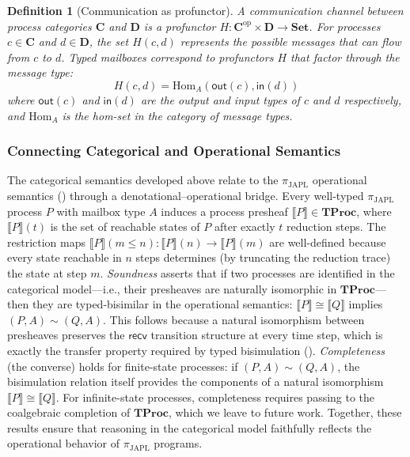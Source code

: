 \documentclass[11pt,a4paper]{article}
\newtheorem{definition}[theorem]{Definition}
\newcommand{\bisim}{\sim}
\newcommand{\Cat}[1]{\mathbf{#1}}
\newcommand{\Set}{\Cat{Set}}
\newcommand{\Hom}{\mathrm{Hom}}
\newcommand{\op}{\mathrm{op}}
\begin{document}
\begin{definition}[Communication as profunctor]\label{def:profunctor}
A \emph{communication channel} between process categories $\Cat{C}$ and $\Cat{D}$ is a profunctor $H : \Cat{C}^{\op} \times \Cat{D} \to \Set$. For processes $c \in \Cat{C}$ and $d \in \Cat{D}$, the set $H(c, d)$ represents the possible messages that can flow from $c$ to $d$. Typed mailboxes correspond to profunctors $H$ that factor through the message type:
\[
H(c, d) = \Hom_A(\mathsf{out}(c), \mathsf{in}(d))
\]
where $\mathsf{out}(c)$ and $\mathsf{in}(d)$ are the output and input types of $c$ and $d$ respectively, and $\Hom_A$ is the hom-set in the category of message types.
\end{definition}

\subsubsection{Connecting Categorical and Operational Semantics}

The categorical semantics developed above relate to the $\pi_{\text{JAPL}}$ operational semantics () through a denotational--operational bridge. Every well-typed $\pi_{\text{JAPL}}$ process $P$ with mailbox type $A$ induces a process presheaf $\llbracket P \rrbracket \in \Cat{TProc}$, where $\llbracket P \rrbracket(t)$ is the set of reachable states of $P$ after exactly $t$ reduction steps. The restriction maps $\llbracket P \rrbracket(m \leq n) : \llbracket P \rrbracket(n) \to \llbracket P \rrbracket(m)$ are well-defined because every state reachable in $n$ steps determines (by truncating the reduction trace) the state at step $m$. \emph{Soundness} asserts that if two processes are identified in the categorical model---i.e., their presheaves are naturally isomorphic in $\Cat{TProc}$---then they are typed-bisimilar in the operational semantics: $\llbracket P \rrbracket \cong \llbracket Q \rrbracket$ implies $(P,A) \bisim (Q,A)$. This follows because a natural isomorphism between presheaves preserves the $\mathsf{recv}$ transition structure at every time step, which is exactly the transfer property required by typed bisimulation (). \emph{Completeness} (the converse) holds for finite-state processes: if $(P,A) \bisim (Q,A)$, the bisimulation relation itself provides the components of a natural isomorphism $\llbracket P \rrbracket \cong \llbracket Q \rrbracket$. For infinite-state processes, completeness requires passing to the coalgebraic completion of $\Cat{TProc}$, which we leave to future work. Together, these results ensure that reasoning in the categorical model faithfully reflects the operational behavior of $\pi_{\text{JAPL}}$ programs.
\end{document}
